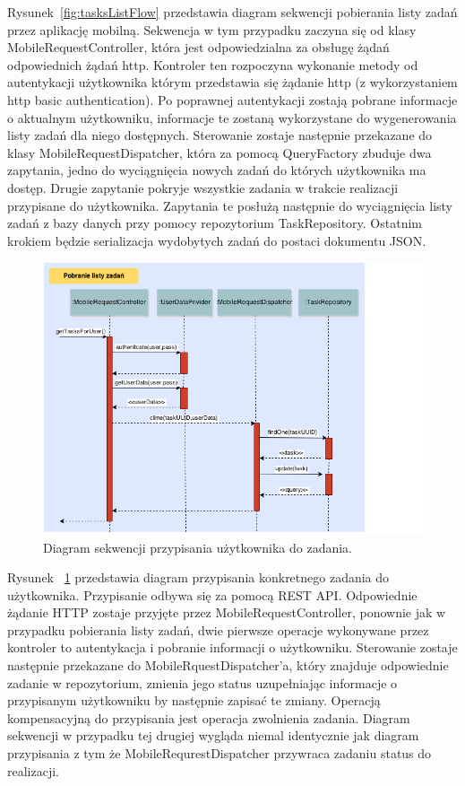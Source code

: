Rysunek~\ref{fig:tasksListFlow} przedstawia diagram sekwencji pobierania listy zadań przez aplikację mobilną. Sekwencja w tym przypadku zaczyna się od klasy MobileRequestController, która jest odpowiedzialna za obsługę żądań odpowiednich żądań http. Kontroler ten rozpoczyna wykonanie metody od autentykacji użytkownika którym przedstawia się żądanie http (z wykorzystaniem http basic authentication). Po poprawnej autentykacji zostają pobrane informacje o aktualnym użytkowniku, informacje te zostaną wykorzystane do wygenerowania listy zadań dla niego dostępnych.  Sterowanie zostaje następnie przekazane do klasy MobileRequestDispatcher, która za pomocą QueryFactory zbuduje dwa zapytania, jedno do wyciągnięcia nowych zadań do których użytkownika ma dostęp. Drugie zapytanie pokryje wszystkie zadania w trakcie realizacji przypisane do użytkownika. Zapytania te posłużą następnie do wyciągnięcia listy zadań z bazy danych przy pomocy repozytorium TaskRepository. Ostatnim krokiem będzie serializacja wydobytych zadań do postaci dokumentu JSON. 

\begin{figure}[h]
\centerline{\includegraphics[scale=0.5]{climeTaskFlow}}
\caption{Diagram sekwencji przypisania użytkownika do zadania.}
\label{fig:climeTaskFlow}
\end{figure}

Rysunek ~\ref{fig:climeTaskFlow} przedstawia diagram przypisania konkretnego zadania do użytkownika. Przypisanie odbywa się za pomocą REST API. Odpowiednie żądanie HTTP zostaje przyjęte przez MobileRequestController, ponownie jak w przypadku pobierania listy zadań, dwie pierwsze operacje wykonywane przez kontroler to autentykacja i pobranie informacji o użytkowniku. Sterowanie zostaje następnie przekazane do MobileRquestDispatcher'a, który znajduje odpowiednie zadanie w repozytorium, zmienia jego status uzupełniając informacje o przypisanym użytkowniku by następnie zapisać te zmiany. Operacją kompensacyjną do przypisania jest operacja zwolnienia zadania. Diagram sekwencji w przypadku tej drugiej wygląda niemal identycznie jak diagram przypisania z tym że MobileRequrestDispatcher przywraca zadaniu status do realizacji. 

